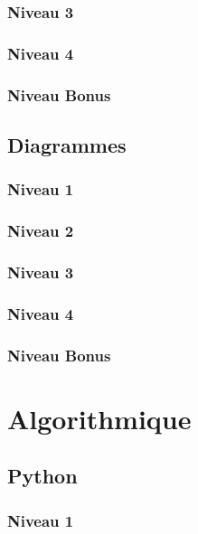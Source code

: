\documentclass[a4paper]{report}
\begin{document}
			\subsection{Niveau 3}
			
			\subsection{Niveau 4}
			
			\subsection{Niveau Bonus}
		
		\section{Diagrammes}
		
			\subsection{Niveau 1}
		
			\subsection{Niveau 2}
		
			\subsection{Niveau 3}
			
			\subsection{Niveau 4}
			
			\subsection{Niveau Bonus}
	
	\chapter{Algorithmique}
	
		\section{Python}
		
			\subsection{Niveau 1}
		
\end{document}
